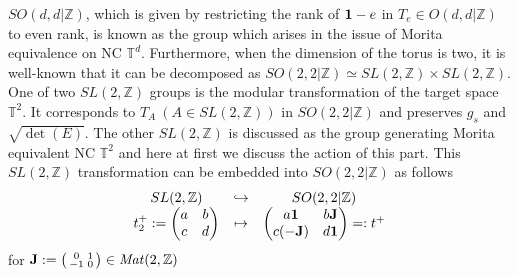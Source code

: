 \documentclass[a4paper,12pt]{article}
\newcommand{\Z}{{\mathbb{Z}}}
\newcommand{\T}{{\mathbb{T}}}
\newcommand{\ba}{\begin{array}}
\newcommand{\ea}{\end{array}}
\newcommand{\bp}{\begin{pmatrix}}
\newcommand{\ep}{\end{pmatrix}}
\def \J{{\bf J}}
\def \1{{\bf 1}}
\def \Mat{\mathit{Mat}}
\begin{document}
$SO(d,d |\Z)$, which is given by restricting the rank of $\1-e$ in 
$T_e\in O(d,d |\Z)$ to even rank, is known as the group which arises in 
the issue of Morita equivalence on NC $\T^d$. 
Furthermore, when the dimension of the torus is two, 
it is well-known that it can be decomposed 
as $SO(2,2 |\Z)\simeq SL(2,\Z)\times SL(2,\Z)$. 
One of two $SL(2,\Z)$ groups is the 
modular transformation of the target space $\T^2$. It corresponds to 
$T_A\ (A\in SL(2,\Z))$ in $SO(2,2 |\Z)$ and 
preserves $g_s$ and $\sqrt{\det(E)}$. 
The other $SL(2,\Z)$ is discussed as the group generating 
Morita equivalent NC $\T^2$ \cite{CDS,PS,KS} 
and here at first we discuss the action of this part. 
This $SL(2,\Z)$ transformation can be embedded into 
$SO(2,2 |\Z)$ as follows
\begin{equation}
 \ba{ccc}
  SL(2,\Z) & \hookrightarrow & SO(2,2 |\Z)\\
  t^+_2:=\bp a&b\\c&d \ep &\mapsto  
  & \bp a{\bf 1}&b \J\\ c(-\J)& d{\bf 1}\ep=:t^+ 
 \ea \label{I}
\end{equation}
for 
\begin{math}\J:=\left(\begin{smallmatrix}
0&1\\-1&0\end{smallmatrix}\right)\in \Mat(2,\Z)\end{math}
\end{document}
